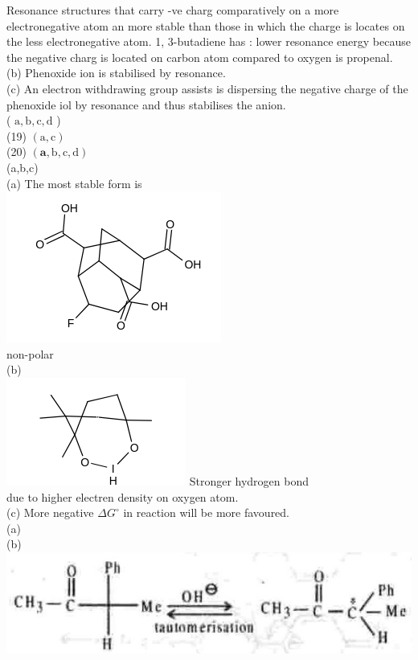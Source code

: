 \documentclass[10pt]{article}
\begin{document}
Resonance structures that carry -ve charg comparatively on a more electronegative atom an more stable than those in which the charge is locates on the less electronegative atom. 1, 3-butadiene has : lower resonance energy because the negative charg is located on carbon atom compared to oxygen is propenal.\\
(b) Phenoxide ion is stabilised by resonance.\\
(c) An electron withdrawing group assists is dispersing the negative charge of the phenoxide iol by resonance and thus stabilises the anion.\\
( $\mathrm{a}, \mathrm{b}, \mathrm{c}, \mathrm{d}$ )\\
(19) $(\mathrm{a}, \mathrm{c})$\\
(20) $(\mathbf{a}, \mathrm{b}, \mathrm{c}, \mathrm{d})$\\
(a,b,c)\\
(a) The most stable form is\\
\includegraphics{smile-638bec569f6d89d5cd14af1739fbea81468a2c0c}\\
non-polar\\
(b)\\
\includegraphics{smile-8117cc07ae436bc48f66cb63936b166672d8c101} Stronger hydrogen bond\\
due to higher electren density on oxygen atom.\\
(c) More negative $\Delta G^{\circ}$ in reaction will be more favoured.\\
(a)\\
(b)\\
\includegraphics[max width=\textwidth, center]{2025_01_28_8470952b98110cec3aabg-165(4)}
\end{document}
